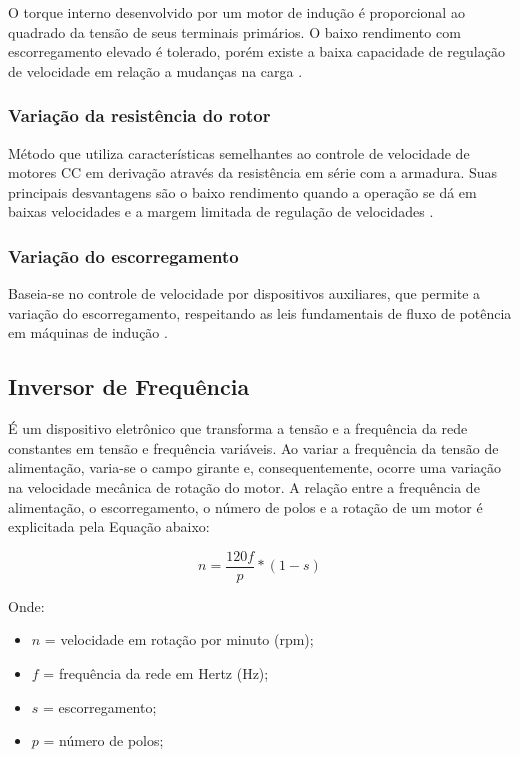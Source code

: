 				O torque interno desenvolvido por um motor de indução é proporcional ao quadrado da tensão de seus terminais primários. O baixo rendimento com escorregamento elevado é tolerado, porém existe a baixa capacidade de regulação de velocidade em relação a mudanças na carga \cite{WEGMotorEletrico}\cite{Fitzgerald}.

			\subsubsection{Variação da resistência do rotor}

				Método que utiliza características semelhantes ao controle de velocidade de motores CC em derivação através da resistência em série com a armadura. Suas principais desvantagens são o baixo rendimento quando a operação se dá em baixas velocidades e a margem limitada de regulação de velocidades \cite{WEGMotorEletrico}\cite{Fitzgerald}.

			\subsubsection{Variação do escorregamento}

				Baseia-se no controle de velocidade por dispositivos auxiliares, que permite a variação do escorregamento, respeitando as leis fundamentais de fluxo de potência em máquinas de indução \cite{WEGMotorEletrico}\cite{Fitzgerald}.


		\subsection{Inversor de Frequência}

			É um dispositivo eletrônico que transforma a tensão e a frequência da rede constantes em tensão e frequência variáveis. Ao variar a frequência da tensão de alimentação, varia-se o campo girante e, consequentemente, ocorre uma variação na velocidade mecânica de rotação do motor. A relação entre a frequência de alimentação, o escorregamento, o número de polos e a rotação de um motor é explicitada pela Equação abaixo:

			$$ n = \frac{120f}{p}*(1-s) $$

			Onde:
			\begin{itemize}
			\item $n$ = velocidade em rotação por minuto (rpm);
			\item $f$ = frequência da rede em Hertz (Hz);
			\item $s$ = escorregamento;
			\item $p$ = número de polos;
			\end{itemize}

